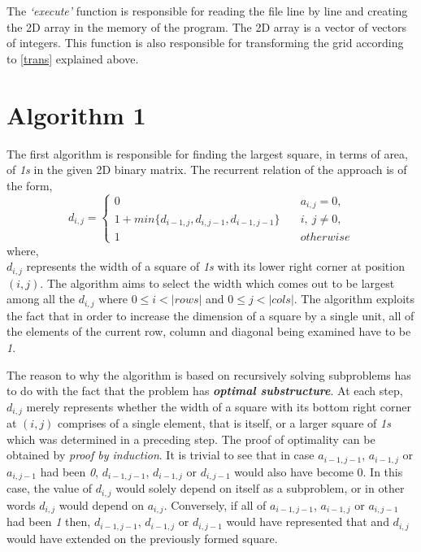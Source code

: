 \documentclass[10pt,a4paper]{article}
\begin{document}
The \textit{`execute'} function is responsible for reading the file line by line and creating the 2D array in the memory of the program.
The 2D array is a vector of vectors of integers.
This function is also responsible for transforming the grid according to \ref{trans} explained above.

\section*{Algorithm 1}
The first algorithm is responsible for finding the largest square, in terms of area, of \textit{1s} in the given 2D binary matrix.
The recurrent relation of the approach is of the form,
\begin{equation} \label{alg1}
        d_{i, j} = \begin{cases}
                0 \quad & a_{i, j} = 0,\\
                1 + min\{d_{i-1, j}, d_{i, j-1}, d_{i-1, j-1}\} \quad & i,\ j \ne 0,\\
                1 \quad & otherwise
        \end{cases}
\end{equation}
where,\\
$ d_{i, j} $ represents the width of a square of \textit{1s} with its lower right corner at position $ (i, j) $.
The algorithm aims to select the width which comes out to be largest among all the $ d_{i, j} $ where $ 0 \leq i < |rows| $ and $ 0 \leq j < |cols| $.
The algorithm exploits the fact that in order to increase the dimension of a square by a single unit, all of the elements of the current row, column and diagonal being examined have to be \textit{1}.

The reason to why the algorithm is based on recursively solving subproblems has to do with the fact that the problem has \textit{\textbf{optimal substructure}}.
At each step, $ d_{i, j} $ merely represents whether the width of a square with its bottom right corner at $ (i, j) $ comprises of a single element, that is itself, or a larger square of \textit{1s} which was determined in a preceding step.
The proof of optimality can be obtained by \textit{proof by induction}.
It is trivial to see that in case $ a_{i-1, j-1} $, $ a_{i-1, j} $ or $ a_{i, j-1} $ had been \textit{0}, $ d_{i-1, j-1} $, $ d_{i-1, j} $ or $ d_{i, j-1} $ would also have become 0.
In this case, the value of $ d_{i, j} $ would solely depend on itself as a subproblem, or in other words $ d_{i, j} $ would depend on $ a_{i, j} $.
Conversely, if all of $ a_{i-1, j-1} $, $ a_{i-1, j} $ or $ a_{i, j-1} $ had been \textit{1} then, $ d_{i-1, j-1} $, $ d_{i-1, j} $ or $ d_{i, j-1} $ would have represented that and $ d_{i, j} $ would have extended on the previously formed square.
\end{document}
